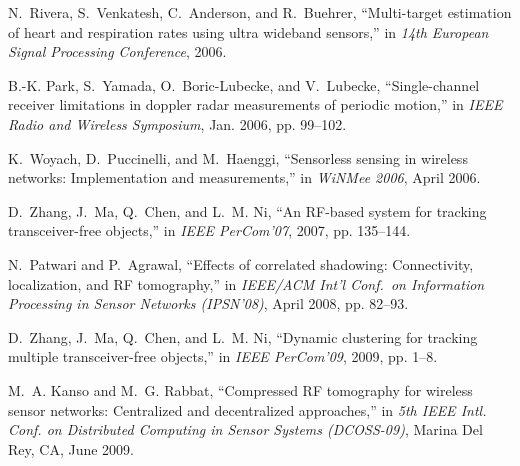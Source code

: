 \documentclass[10pt,journal,letterpaper]{IEEEtran}
\begin{document}
\begin{thebibliography}{10}
\providecommand{\url}[1]{#1}
\def\UrlFont{\rmfamily}
\providecommand{\newblock}{\relax}
\providecommand{\bibinfo}[2]{#2}
\providecommand\BIBentrySTDinterwordspacing{\spaceskip=0pt\relax}
\providecommand\BIBentryALTinterwordstretchfactor{4}
\providecommand\BIBentryALTinterwordspacing{\spaceskip=\fontdimen2\font plus
\BIBentryALTinterwordstretchfactor\fontdimen3\font minus
  \fontdimen4\font\relax}
\providecommand\BIBforeignlanguage[2]{{\expandafter\ifx\csname l@#1\endcsname\relax
\typeout{** WARNING: IEEEtran.bst: No hyphenation pattern has been}\typeout{** loaded for the language `#1'. Using the pattern for}\typeout{** the default language instead.}\else
\language=\csname l@#1\endcsname
\fi
#2}}

N.~Rivera, S.~Venkatesh, C.~Anderson, and R.~Buehrer, ``Multi-target estimation
  of heart and respiration rates using ultra wideband sensors,'' in \emph{14th
  European Signal Processing Conference}, 2006.

B.-K. Park, S.~Yamada, O.~Boric-Lubecke, and V.~Lubecke, ``Single-channel
  receiver limitations in doppler radar measurements of periodic motion,'' in
  \emph{IEEE Radio and Wireless Symposium}, Jan. 2006, pp. 99--102.

K.~Woyach, D.~Puccinelli, and M.~Haenggi, ``Sensorless sensing in wireless
  networks: Implementation and measurements,'' in \emph{WiNMee 2006}, April
  2006.

D.~Zhang, J.~Ma, Q.~Chen, and L.~M. Ni, ``{An {RF}-based system for tracking
  transceiver-free objects},'' in \emph{IEEE PerCom'07}, 2007, pp. 135--144.

N.~Patwari and P.~Agrawal, ``Effects of correlated shadowing: Connectivity,
  localization, and {RF} tomography,'' in \emph{IEEE/ACM Int'l Conf.~on
  Information Processing in Sensor Networks (IPSN'08)}, April 2008, pp. 82--93.

D.~Zhang, J.~Ma, Q.~Chen, and L.~M. Ni, ``Dynamic clustering for tracking
  multiple transceiver-free objects,'' in \emph{IEEE PerCom'09}, 2009, pp.
  1--8.

M.~A. Kanso and M.~G. Rabbat, ``Compressed {RF} tomography for wireless sensor
  networks: Centralized and decentralized approaches,'' in \emph{5th IEEE Intl.
  Conf. on Distributed Computing in Sensor Systems (DCOSS-09)}, Marina Del Rey,
  CA, June 2009.


\end{thebibliography}
\end{document}

